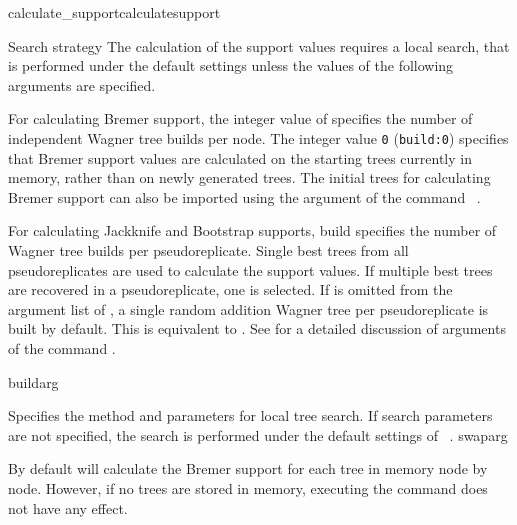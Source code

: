 \begin{command}{calculate\_support}{calculatesupport}
\begin{statement}
\begin{arguments}
        \begin{argumentgroup}{Search strategy}
            {The calculation of the support values requires a local search,
            that is performed under the default settings unless the values
            of the following arguments are specified.}
         
                {For calculating Bremer support, the integer value of
                 specifies the number of independent Wagner
                tree builds per node. The integer value \texttt{0} (\texttt{build:0})
                specifies that Bremer support values are calculated on the starting
                trees currently in memory, rather than on newly generated trees.
                The initial trees for calculating Bremer support can also be
                imported using the argument  of the command
                ~.
             
                For calculating Jackknife and Bootstrap supports, build specifies
                the number of Wagner tree builds per pseudoreplicate. Single best
                trees from all pseudoreplicates are used to calculate the support
                values. If multiple best trees are recovered in a pseudoreplicate,
                one is selected. If  is omitted from the argument
                list of , a single random addition
                Wagner tree per pseudoreplicate is built by default. This is
                equivalent to . See
                 for a detailed discussion of arguments
                of the command .}
                {buildarg}

                {Specifies the method and parameters for local tree search. If
                search parameters are not specified, the search is performed under
                the default settings of ~.} 
                {swaparg}
         
        \end{argumentgroup}

    \end{arguments}

        {By default \poy will calculate the Bremer support for each tree in memory 
        node by node.  However, if no trees are stored in memory, executing the
        command  does not have any effect.}
    

\end{statement}
\end{command}
